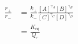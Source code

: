 \begin{eqnarray}
\frac{r_+}{r_-} & = \frac{k_+}{k_-}\frac{[A]^{\gamma_A}[B]^{\gamma_B}}{[C]^{\gamma_C}[D]^{\gamma_D}} \\
&  =  \frac{K_{eq}}{Q_r} \\
\end{eqnarray}